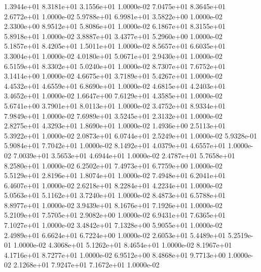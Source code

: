 1.3944e+01 8.3181e+01 3.1556e+01 1.0000e-02
7.0475e+01 8.3645e+01 2.6772e+01 1.0000e-02
5.9788e+01 6.9981e+01 3.5822e+00 1.0000e-02
2.3300e+00 8.9512e+01 5.8086e+01 1.0000e-02
6.1867e+01 8.3155e+01 5.8918e+01 1.0000e-02
3.8887e+01 3.4377e+01 5.2960e+00 1.0000e-02
5.1857e+01 8.4205e+01 1.5011e+01 1.0000e-02
8.5657e+01 6.6035e+01 3.3004e+01 1.0000e-02
4.0180e+01 5.0671e+01 2.9430e+01 1.0000e-02
6.5159e+01 8.3302e+01 5.0240e+01 1.0000e-02
8.7307e+01 7.6752e+01 3.1414e+00 1.0000e-02
4.6675e+01 3.7189e+01 5.4267e+01 1.0000e-02
4.4532e+01 4.6559e+01 6.8690e+01 1.0000e-02
4.6815e+01 4.2403e+01 3.4652e+01 1.0000e-02
1.6647e+00 7.6129e+01 4.3585e+01 1.0000e-02
5.6741e+00 3.7901e+01 8.0113e+01 1.0000e-02
3.4752e+01 8.9334e+01 7.9849e+01 1.0000e-02
7.6989e+01 3.5245e+01 2.3132e+01 1.0000e-02
2.8275e+01 4.3293e+01 1.8690e+01 1.0000e-02
1.4936e+00 2.5113e+01 5.3922e+01 1.0000e-02
2.0873e+01 6.0744e+01 2.5249e+01 1.0000e-02
5.9328e-01 5.9084e+01 7.7042e+01 1.0000e-02
8.1492e+01 4.0379e+01 4.6557e+01 1.0000e-02
7.0039e+01 3.5653e+01 4.6944e+01 1.0000e-02
2.4787e+01 5.7658e+01 8.2580e+01 1.0000e-02
6.2502e+01 7.4973e+01 6.7759e+00 1.0000e-02
5.5129e+01 2.8196e+01 1.8074e+01 1.0000e-02
7.4948e+01 6.2041e+01 6.4607e+01 1.0000e-02
2.6218e+01 8.2284e+01 4.2234e+01 1.0000e-02
5.0563e+01 5.1162e+01 3.7240e+01 1.0000e-02
8.4873e+01 6.5788e+01 8.8977e+01 1.0000e-02
3.9439e+01 8.1676e+01 7.1926e+01 1.0000e-02
5.2109e+01 7.5705e+01 2.9082e+00 1.0000e-02
6.9431e+01 7.6365e+01 7.1027e+01 1.0000e-02
3.4842e+01 7.1328e+00 5.9055e+01 1.0000e-02
2.4989e+01 6.6624e+01 6.7224e+00 1.0000e-02
2.6053e+01 5.4489e+01 5.2519e-01 1.0000e-02
4.3068e+01 5.1262e+01 8.4654e+01 1.0000e-02
8.1967e+01 4.1716e+01 8.7277e+01 1.0000e-02
6.9512e+00 8.4868e+01 9.7713e+00 1.0000e-02
2.1268e+01 7.9247e+01 7.1672e+01 1.0000e-02
